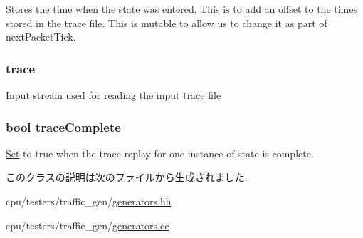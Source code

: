 Stores the time when the state was entered. This is to add an offset to the times stored in the trace file. This is mutable to allow us to change it as part of nextPacketTick. \hypertarget{classTraceGen_a5dfbfce0ad4d1bee9295a75fb9f22e67}{
\subsubsection[{trace}]{ {\bf trace}}}
\label{classTraceGen_a5dfbfce0ad4d1bee9295a75fb9f22e67}
Input stream used for reading the input trace file \hypertarget{classTraceGen_a072f6c8d6720b220445074f5a4c0ceff}{
\subsubsection[{traceComplete}]{\setlength{\rightskip}{0pt plus 5cm}bool {\bf traceComplete}}}
\label{classTraceGen_a072f6c8d6720b220445074f5a4c0ceff}
\hyperlink{classSet}{Set} to true when the trace replay for one instance of state is complete. 

このクラスの説明は次のファイルから生成されました:\begin{DoxyCompactItemize}
\item 
cpu/testers/traffic\_\-gen/\hyperlink{generators_8hh}{generators.hh}\item 
cpu/testers/traffic\_\-gen/\hyperlink{generators_8cc}{generators.cc}\end{DoxyCompactItemize}
